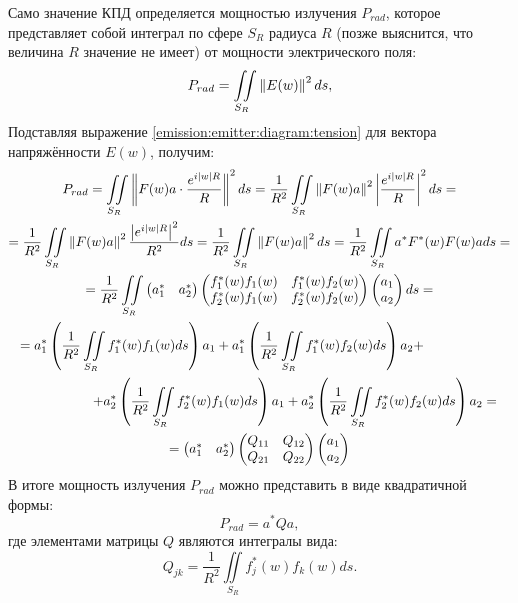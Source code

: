 Само значение КПД определяется мощностью излучения $P_{rad}$, которое представляет собой интеграл по сфере $S_R$ радиуса $R$ (позже выяснится, что величина $R$ значение не имеет)
от мощности электрического поля:
\[
    P_{rad}
    = \iint \limits_{S_R} \left \| E(w) \right \|^2 ds ,
\]
Подставляя выражение \eqref{emission:emitter:diagram:tension} для вектора напряжённости $E(w)$, получим:
\begin{multline*}
    P_{rad}
    = \iint \limits_{S_R} \norm{F(w) a \cdot \frac{e^{i \modulus{w} R}}{R}}^2 ds
    = \frac{1}{R^2} \iint \limits_{S_R} \norm{F(w) a}^2 \modulus{\frac{e^{i \modulus{w} R}}{R}}^2 ds = \\
    = \frac{1}{R^2} \iint \limits_{S_R} \norm{F(w) a}^2 \frac{\modulus{e^{i \modulus{w} R}}^2}{R^2} ds
    = \frac{1}{R^2} \iint \limits_{S_R} \norm{F(w) a}^2 ds
    = \frac{1}{R^2} \iint \limits_{S_R} a^* F^*(w) F(w) a ds = \\
    = \frac{1}{R^2}
    \iint \limits_{S_R}
    \begin{pmatrix}
        a_1^* & a_2^*
    \end{pmatrix}
    \begin{pmatrix}
        f_1^*(w) f_1(w) & f_1^*(w) f_2(w) \\
        f_2^*(w) f_1(w) & f_2^*(w) f_2(w)
    \end{pmatrix}
    \begin{pmatrix}
        a_1 \\
        a_2
    \end{pmatrix}
    ds = \\
    \shoveleft{= a_1^* \left( \frac{1}{R^2} \iint \limits_{S_R} f_1^*(w) f_1(w) ds \right) a_1 + a_1^* \left( \frac{1}{R^2} \iint \limits_{S_R} f_1^*(w) f_2(w) ds \right) a_2 +} \\
    \shoveright{+ a_2^* \left( \frac{1}{R^2} \iint \limits_{S_R} f_2^*(w) f_1(w) ds \right) a_1 + a_2^* \left( \frac{1}{R^2} \iint \limits_{S_R} f_2^*(w) f_2(w) ds \right) a_2 =} \\
    = \begin{pmatrix}
          a_1^* & a_2^*
    \end{pmatrix}
    \begin{pmatrix}
        Q_{11} & Q_{12} \\
        Q_{21} & Q_{22}
    \end{pmatrix}
    \begin{pmatrix}
        a_1 \\
        a_2
    \end{pmatrix}
\end{multline*}
В итоге мощность излучения $P_{rad}$ можно представить в виде квадратичной формы:
\[
    P_{rad}
    = a^* Q a ,
\]
где элементами матрицы $Q$ являются интегралы вида:
\[
    Q_{jk} = \frac{1}{R^2} \iint \limits_{S_R} f_j^*(w) f_k(w) d s .
\]


